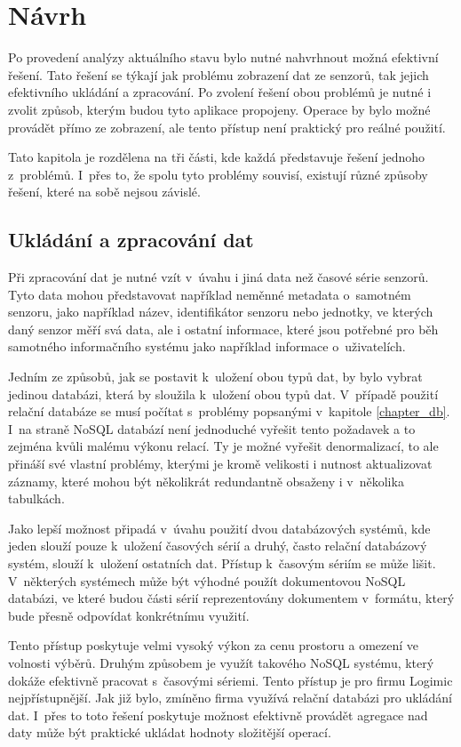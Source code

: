 \chapter{Návrh}
\label{chapter_desing}
Po provedení analýzy aktuálního stavu bylo nutné nahvrhnout možná efektivní řešení. Tato řešení se týkají jak problému zobrazení dat ze senzorů, tak jejich efektivního ukládání a zpracování. Po zvolení řešení obou problémů je nutné i zvolit způsob, kterým budou tyto aplikace propojeny. Operace by bylo možné provádět přímo ze zobrazení, ale tento přístup není praktický pro reálné použití.

Tato kapitola je rozdělena na tři části, kde každá představuje řešení jednoho z~problémů. I~přes to, že spolu tyto problémy souvisí, existují různé způsoby řešení, které na sobě nejsou závislé.

\section{Ukládání a zpracování dat}
Při zpracování dat je nutné vzít v~úvahu i jiná data než časové série senzorů. Tyto data mohou představovat například neměnné metadata o~samotném senzoru, jako například název, identifikátor senzoru nebo jednotky, ve kterých daný senzor měří svá data, ale i ostatní informace, které jsou potřebné pro běh samotného informačního systému jako například informace o~uživatelích. 

Jedním ze způsobů, jak se postavit k~uložení obou typů dat, by bylo vybrat jedinou databázi, která by sloužila k~uložení obou typů dat. V~případě použití relační databáze se musí počítat s~problémy popsanými v~kapitole \ref{chapter_db}. I~na straně NoSQL databází není jednoduché vyřešit tento požadavek a to zejména kvůli malému výkonu relací. Ty je možné vyřešit denormalizací, to ale přináší své vlastní problémy, kterými je kromě velikosti i nutnost aktualizovat záznamy, které mohou být několikrát redundantně obsaženy i v~několika tabulkách.

Jako lepší možnost připadá v~úvahu použití dvou databázových systémů, kde jeden slouží pouze k~uložení časových sérií a druhý, často relační databázový systém, slouží k~uložení ostatních dat. Přístup k~časovým sériím se může lišit. V~některých systémech může být výhodné použít dokumentovou NoSQL databázi, ve které budou části sérií reprezentovány dokumentem v~formátu, který bude přesně odpovídat konkrétnímu využití.

Tento přístup poskytuje velmi vysoký výkon za cenu prostoru a omezení ve volnosti výběrů. Druhým způsobem je využít takového NoSQL systému, který dokáže efektivně pracovat s~časovými sériemi. Tento přístup je pro firmu Logimic nejpřístupnější. Jak již bylo, zmíněno firma využívá relační databázi pro ukládání dat. I~přes to toto řešení poskytuje možnost efektivně provádět agregace nad daty může být praktické ukládat hodnoty složitější operací. 

